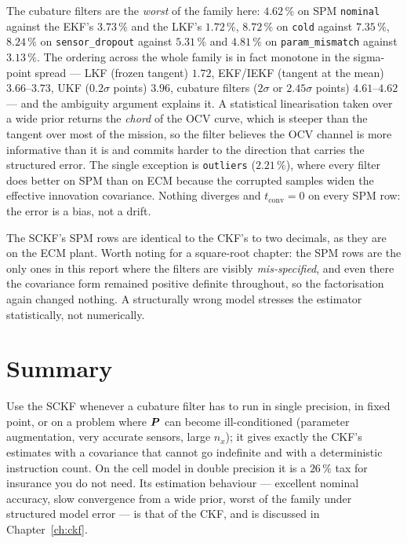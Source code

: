 The cubature filters are the \emph{worst} of the family here: $4.62\,\%$ on SPM
\texttt{nominal} against the EKF's $3.73\,\%$ and the LKF's $1.72\,\%$, $8.72\,\%$ on
\texttt{cold} against $7.35\,\%$, $8.24\,\%$ on \texttt{sensor\_dropout} against $5.31\,\%$ and
$4.81\,\%$ on \texttt{param\_mismatch} against $3.13\,\%$. The ordering across the whole family
is in fact monotone in the sigma-point spread --- LKF (frozen tangent) $1.72$, EKF/IEKF
(tangent at the mean) $3.66$--$3.73$, UKF ($0.2\sigma$ points) $3.96$, cubature filters
($2\sigma$ or $2.45\sigma$ points) $4.61$--$4.62$ --- and the ambiguity argument explains it.
A statistical linearisation taken over a wide prior returns the \emph{chord} of the OCV curve,
which is steeper than the tangent over most of the mission, so the filter believes the OCV
channel is more informative than it is and commits harder to the direction that carries the
structured error. The single exception is \texttt{outliers} ($2.21\,\%$), where every filter
does better on SPM than on ECM because the corrupted samples widen the effective innovation
covariance. Nothing diverges and $t_{\text{conv}} = 0$ on every SPM row: the error is a bias,
not a drift.

The SCKF's SPM rows are identical to the CKF's to two decimals, as they are on the ECM plant.
Worth noting for a square-root chapter: the SPM rows are the only ones in this report where the
filters are visibly \emph{mis-specified}, and even there the covariance form remained positive
definite throughout, so the factorisation again changed nothing. A structurally wrong model
stresses the estimator statistically, not numerically.

\section{Summary}
Use the SCKF whenever a cubature filter has to run in single precision, in fixed point, or on a
problem where $\bm{P}$ can become ill-conditioned (parameter augmentation, very accurate sensors,
large $n_x$); it gives exactly the CKF's estimates with a covariance that cannot go indefinite
and with a deterministic instruction count. On the cell model in double precision it is a
$26\,\%$ tax for insurance you do not need. Its estimation behaviour --- excellent nominal
accuracy, slow convergence from a wide prior, worst of the family under structured model error
--- is that of the CKF, and is discussed in Chapter~\ref{ch:ckf}.
